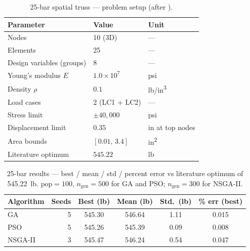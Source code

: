 \begin{table}[htbp]
  \centering
  \caption{25-bar spatial truss — problem setup (after \cite{schmit1976}).}
  \label{tab:results:25bar-setup}
  \begin{tabular}{lll}
    \toprule
    Parameter               & Value                  & Unit \\
    \midrule
    Nodes                   & 10 (3D)                & --- \\
    Elements                & 25                     & --- \\
    Design variables (groups)& 8                     & --- \\
    Young's modulus $E$     & $1.0 \times 10^{7}$    & psi \\
    Density $\rho$          & $0.1$                  & lb/in\textsuperscript{3} \\
    Load cases              & 2 (LC1 + LC2)          & --- \\
    Stress limit            & $\pm 40{,}000$         & psi \\
    Displacement limit      & $0.35$                 & in at top nodes \\
    Area bounds             & $[0.01,\, 3.4]$        & in\textsuperscript{2} \\
    Literature optimum      & $545.22$               & lb \\
    \bottomrule
  \end{tabular}
\end{table}

\begin{table}[htbp]
  \centering
  \caption{25-bar results — best / mean / std / percent error vs
    literature optimum of \num{545.22}~lb. $\mathrm{pop} = 100$,
    $n_\text{gen} = 500$ for GA and PSO; $n_\text{gen} = 300$ for
    NSGA-II.}
  \label{tab:results:25bar}
  \begin{tabular}{lrSSSS}
    \toprule
    Algorithm & Seeds & {Best (lb)} & {Mean (lb)} & {Std.\ (lb)} & {\% err (best)} \\
    \midrule
    GA      & 5 & 545.30 & 546.64 & 1.11 & 0.015 \\
    PSO     & 5 & 545.26 & 545.39 & 0.09 & 0.008 \\
    NSGA-II & 3 & 545.47 & 546.24 & 0.54 & 0.047 \\
    \bottomrule
  \end{tabular}
\end{table}

